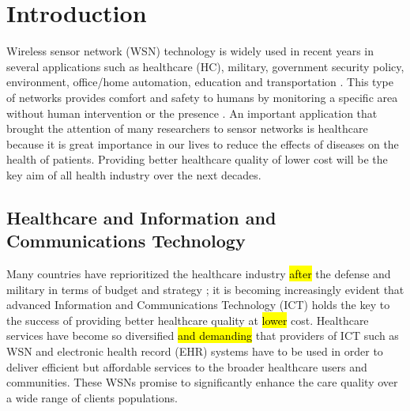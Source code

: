 \documentclass[a4paper,11pt]{article}
\DeclareRobustCommand{\hlyellow}[1]{{\sethlcolor{white}\hl{#1}}}
\begin{document}
\section{Introduction}
Wireless sensor network (WSN) technology is widely used in recent years in several applications such as healthcare (HC), military, government security policy, environment, office/home automation, education and transportation \cite{pr9,pr3,pr5}. This type of networks provides comfort and safety to humans by monitoring a specific area without human intervention or the presence \cite{pr1}. An important application that brought the attention of many researchers to sensor networks is healthcare because it is great importance in our lives to reduce the effects of diseases on the health of patients. Providing better healthcare quality of lower cost will be the key aim of all health industry over the next decades.

\subsection{Healthcare and Information and Communications Technology}
Many countries have reprioritized the healthcare industry \hlyellow{after} the defense and military in terms of budget and strategy \cite{pr44}; it is becoming increasingly evident that advanced Information and Communications Technology (ICT) holds the key to the success of providing better healthcare quality at \hlyellow{lower} cost. Healthcare services have become so diversified \hlyellow{and demanding} that providers of ICT such as WSN and electronic health record (EHR) systems have to be used in order to deliver efficient but affordable services to the broader healthcare users and communities. These WSNs promise to significantly enhance the care quality over a wide range of clients populations.  
\end{document}
